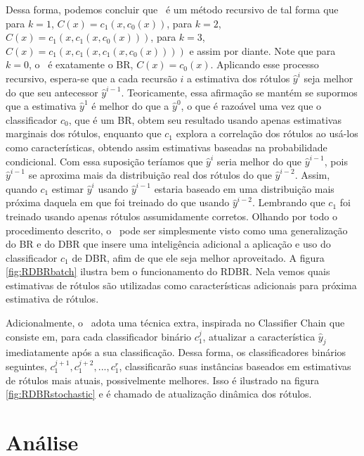  Dessa forma, podemos concluir que \MRLM~é um método recursivo de tal forma que
 para $k=1$, $C(x)=c_1(x,c_0(x))$,
 para $k=2$, $C(x)=c_1(x,c_1(x,c_0(x)))$,
 para $k=3$, $C(x)=c_1(x,c_1(x,c_1(x,c_0(x))))$ e assim por diante.
 Note que para $k=0$, o \MRLMa~é exatamente o BR, $C(x)=c_0(x)$.
 Aplicando esse processo recursivo, espera-se que a cada recursão $i$ a estimativa dos rótulos $\hat{y}^i$ seja melhor do que
 seu antecessor $\hat{y}^{i-1}$. Teoricamente, essa afirmação se mantém se supormos que a estimativa $\hat{y}^1$ é melhor do que a $\hat{y}^0$, 
 o que é razoável uma vez que o classificador $c_0$, que é um BR, obtem seu resultado usando apenas estimativas marginais dos rótulos,
  enquanto que $c_1$ explora a correlação dos rótulos ao usá-los como características, obtendo assim 
 estimativas baseadas na probabilidade condicional.
 Com essa suposição teríamos que $\hat{y}^i$ seria melhor do que $\hat{y}^{i-1}$, pois $\hat{y}^{i-1}$ se aproxima
 mais da distribuição real dos rótulos do que $\hat{y}^{i-2}$. Assim, quando $c_1$ estimar $\hat{y}^i$ usando $\hat{y}^{i-1}$ estaria baseado em 
 uma distribuição mais próxima daquela em que foi treinado do que usando $\hat{y}^{i-2}$.
 Lembrando que $c_1$ foi treinado usando apenas rótulos assumidamente corretos.
  Olhando por todo o procedimento descrito, o \MRLMa~pode ser simplesmente visto como uma generalização do BR e do DBR
 que insere uma inteligência
 adicional a aplicação e uso do classificador $c_1$ de DBR, afim de que ele seja melhor aproveitado.
 A figura \ref{fig:RDBRbatch} ilustra bem o funcionamento do RDBR.
 Nela vemos quais estimativas de rótulos são utilizadas como características adicionais
 para próxima estimativa de rótulos.
 
  Adicionalmente, o \MRLMa~adota uma técnica extra, inspirada no Classifier Chain que consiste em, para
 cada classificador binário $c_1^j$, atualizar a característica $\hat{y}_j$ imediatamente após 
 a sua classificação. Dessa forma, os classificadores binários seguintes, $c_1^{j+1},c_1^{j+2},...,c_1^{r}$,
 classificarão suas instâncias baseados em estimativas de rótulos mais atuais, possivelmente melhores. Isso é ilustrado
 na figura \ref{fig:RDBRstochastic} e é chamado de atualização dinâmica dos rótulos.
 

 
 \section{Análise}
 \label{sec:mrlm_analise} 
 
